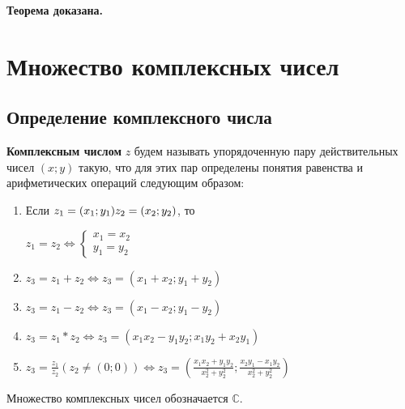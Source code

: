 \documentclass{article}
\newcommand{\parspace}{\vspace{10pt}}
\begin{document}
\textbf{Теорема доказана.}

\section{Множество комплексных чисел}

\subsection{Определение комплексного числа}

\textbf{Комплексным числом} $z$ будем называть упорядоченную пару действительных
чисел $(x;y)$ такую, что для этих пар определены понятия равенства и арифметических
операций следующим образом:

\begin{enumerate}
    \item Если $\\ z_1 = (x_1;y_1) \\ z_2 = (x_2;y_2)$, то
    
    $z_1 = z_2 \Leftrightarrow \begin{cases}
        x_1 = x_2 \\
        y_1 = y_2
    \end{cases}$

    \item $z_3 = z_1 + z_2 \Leftrightarrow z_3 = (x_1 + x_2; y_1 + y_2)$
    \item $z_3 = z_1 - z_2 \Leftrightarrow z_3 = (x_1 - x_2; y_1 - y_2)$
    \item $z_3 = z_1 * z_2 \Leftrightarrow z_3 = (x_1 x_2 - y_1 y_2; x_1 y_2 + x_2 y_1)$
    \item $z_3 = \frac{z_1}{z_2} (z_2 \neq (0; 0)) \Leftrightarrow 
    z_3 = (\frac{x_1 x_2 + y_1 y_2}{x_2^2 + y_2^2}; \frac{x_2 y_1 - x_1 y_2}{x_2^2 + y_2^2})$
\end{enumerate}

Множество комплексных чисел обозначается $\mathbb{C}$.

\parspace
\end{document}

